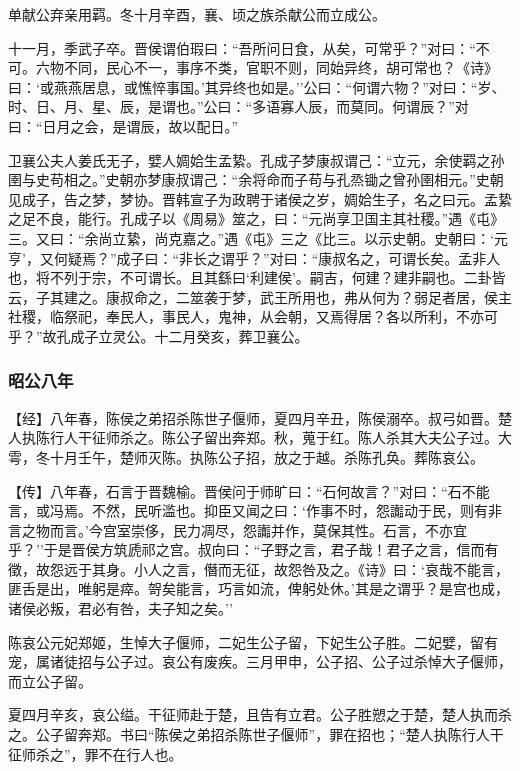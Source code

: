 \documentclass[]{article}
\begin{document}
单献公弃亲用羁。冬十月辛酉，襄、顷之族杀献公而立成公。

十一月，季武子卒。晋侯谓伯瑕曰：``吾所问日食，从矣，可常乎？''对曰：``不可。六物不同，民心不一，事序不类，官职不则，同始异终，胡可常也？《诗》曰：`或燕燕居息，或憔悴事国。'其异终也如是。''公曰：``何谓六物？''对曰：``岁、时、日、月、星、辰，是谓也。''公曰：``多语寡人辰，而莫同。何谓辰？''对曰：``日月之会，是谓辰，故以配日。''

卫襄公夫人姜氏无子，嬖人婤姶生孟絷。孔成子梦康叔谓己：``立元，余使羁之孙圉与史苟相之。''史朝亦梦康叔谓己：``余将命而子苟与孔烝锄之曾孙圉相元。''史朝见成子，告之梦，梦协。晋韩宣子为政聘于诸侯之岁，婤姶生子，名之曰元。孟絷之足不良，能行。孔成子以《周易》筮之，曰：``元尚享卫国主其社稷。''遇《屯》三。又曰：``余尚立絷，尚克嘉之。''遇《屯》三之《比三。以示史朝。史朝曰：`元亨'，又何疑焉？''成子曰：``非长之谓乎？''对曰：``康叔名之，可谓长矣。孟非人也，将不列于宗，不可谓长。且其繇曰`利建侯'。嗣吉，何建？建非嗣也。二卦皆云，子其建之。康叔命之，二筮袭于梦，武王所用也，弗从何为？弱足者居，侯主社稷，临祭祀，奉民人，事民人，鬼神，从会朝，又焉得居？各以所利，不亦可乎？''故孔成子立灵公。十二月癸亥，葬卫襄公。

\hypertarget{header-n2503}{%
\subsubsection{昭公八年}\label{header-n2503}}

【经】八年春，陈侯之弟招杀陈世子偃师，夏四月辛丑，陈侯溺卒。叔弓如晋。楚人执陈行人干征师杀之。陈公子留出奔郑。秋，蒐于红。陈人杀其大夫公子过。大雩，冬十月壬午，楚师灭陈。执陈公子招，放之于越。杀陈孔奂。葬陈哀公。

【传】八年春，石言于晋魏榆。晋侯问于师旷曰：``石何故言？''对曰：``石不能言，或冯焉。不然，民听滥也。抑臣又闻之曰：`作事不时，怨讟动于民，则有非言之物而言。'今宫室崇侈，民力凋尽，怨讟并作，莫保其性。石言，不亦宜乎？''于是晋侯方筑虒祁之宫。叔向曰：``子野之言，君子哉！君子之言，信而有徵，故怨远于其身。小人之言，僭而无征，故怨咎及之。《诗》曰：`哀哉不能言，匪舌是出，唯躬是瘁。哿矣能言，巧言如流，俾躬处休。'其是之谓乎？是宫也成，诸侯必叛，君必有咎，夫子知之矣。''

陈哀公元妃郑姬，生悼大子偃师，二妃生公子留，下妃生公子胜。二妃嬖，留有宠，属诸徒招与公子过。哀公有废疾。三月甲申，公子招、公子过杀悼大子偃师，而立公子留。

夏四月辛亥，哀公缢。干征师赴于楚，且告有立君。公子胜愬之于楚，楚人执而杀之。公子留奔郑。书曰``陈侯之弟招杀陈世子偃师''，罪在招也；``楚人执陈行人干征师杀之''，罪不在行人也。
\end{document}
